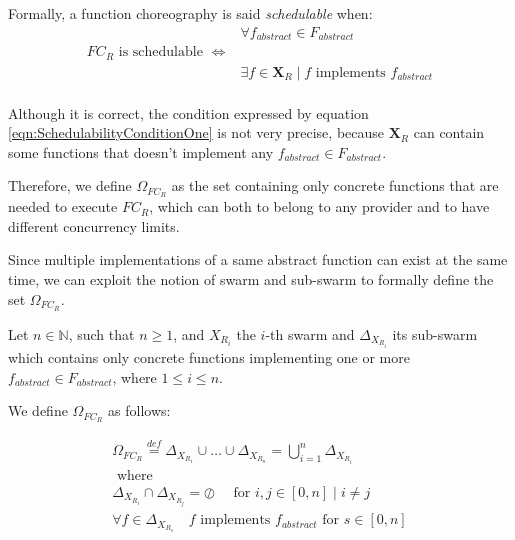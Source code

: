 \documentclass[10pt,a4paper]{article}
\newcommand{\mathDef}{\overset{\textit{def}}{=}}
\theoremstyle{definition}
\begin{document}
Formally, a function choreography is said \textit{schedulable} when: 
\begin{equation}
\label{eqn:SchedulabilityConditionOne}
\begin{array}{lc}

& \forall f_{abstract} \in F_{abstract} \\

FC_R \text{ is schedulable } \Leftrightarrow & \\
 & \exists f \in \textbf{X}_R \mid  f \text{ implements } f_{abstract} \\
\end{array}
\end{equation}

Although it is correct, the condition expressed by equation \ref{eqn:SchedulabilityConditionOne} is not very precise, because $\textbf{X}_R$ can contain some functions that doesn't implement any $f_{abstract} \in F_{abstract}$.

Therefore, we define $\Omega_{FC_R}$ as the set containing only concrete functions that are needed to execute $FC_R$, which can both to belong to any provider and to have different concurrency limits.

Since multiple implementations of a same abstract function can exist at the same time, we can exploit the notion of swarm and sub-swarm to formally define the set $\Omega_{FC_R}$.

Let $n \in \mathbb{N}$, such that $n \geq 1$, and $X_{R_i}$ the $i$-th swarm and $\Delta_{X_{R_i}}$ its sub-swarm which contains only concrete functions implementing one or more $f_{abstract} \in F_{abstract}$, where $1 \leq i \leq n$.

We define $\Omega_{FC_R}$ as follows: 

\begin{equation}
\begin{array}{c}
\Omega_{FC_R} \mathDef \Delta_{X_{R_1}} \cup  \ldots \cup \Delta_{X_{R_n}} = \bigcup_{i = 1}^n \Delta_{X_{R_i}} \\

\text{ where } \\	

\Delta_{X_{R_i}} \cap \Delta_{X_{R_j}} = \oslash \quad \text{ for } i,j \in \left[ 0, n \right] \mid i \neq j \\

\forall f \in \Delta_{X_{R_s}} \quad f \text{ implements } f_{abstract} \text{ for } s \in \left[ 0, n \right] \\

\end{array}
\end{equation}
\end{document}
